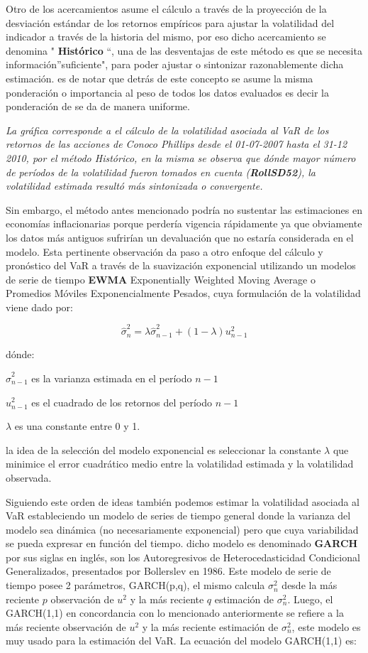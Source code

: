\documentclass[]{article}
\begin{document}
Otro de los acercamientos asume el cálculo a través de la proyección de
la desviación estándar de los retornos empíricos para ajustar la
volatilidad del indicador a través de la historia del mismo, por eso
dicho acercamiento se denomina " \textbf{Histórico} ``, una de las
desventajas de este método es que se necesita información''suficiente",
para poder ajustar o sintonizar razonablemente dicha estimación. es de
notar que detrás de este concepto se asume la misma ponderación o
importancia al peso de todos los datos evaluados es decir la ponderación
de se da de manera uniforme.

\emph{La gráfica corresponde a el cálculo de la volatilidad asociada al
VaR de los retornos de las acciones de Conoco Phillips desde el
01-07-2007 hasta el 31-12 2010, por el método Histórico, en la misma se
observa que dónde mayor número de períodos de la volatilidad fueron
tomados en cuenta (\textbf{RollSD52}), la volatilidad estimada resultó
más sintonizada o convergente.}

Sin embargo, el método antes mencionado podría no sustentar las
estimaciones en economías inflacionarias porque perdería vigencia
rápidamente ya que obviamente los datos más antiguos sufrirían un
devaluación que no estaría considerada en el modelo. Esta pertinente
observación da paso a otro enfoque del cálculo y pronóstico del VaR a
través de la suavización exponencial utilizando un modelos de serie de
tiempo \textbf{EWMA} Exponentially Weighted Moving Average o Promedios
Móviles Exponencialmente Pesados, cuya formulación de la volatilidad
viene dado por:

\[\hat{\sigma}_n^2 = \lambda \hat{\sigma}_{n-1}^2 + (1 - \lambda) u_{n-1}^2\]

dónde:

\(\hat{\sigma}_{n-1}^2\) es la varianza estimada en el período \(n-1\)

\(u_{n-1}^2\) es el cuadrado de los retornos del período \(n-1\)

\(\lambda\) es una constante entre 0 y 1.

la idea de la selección del modelo exponencial es seleccionar la
constante \(\lambda\) que minimice el error cuadrático medio entre la
volatilidad estimada y la volatilidad observada.

Siguiendo este orden de ideas también podemos estimar la volatilidad
asociada al VaR estableciendo un modelo de series de tiempo general
donde la varianza del modelo sea dinámica (no necesariamente
exponencial) pero que cuya variabilidad se pueda expresar en función del
tiempo. dicho modelo es denominado \textbf{GARCH} por sus siglas en
inglés, son los Autoregresivos de Heterocedasticidad Condicional
Generalizados, presentados por Bollerslev en 1986. Este modelo de serie
de tiempo posee 2 parámetros, GARCH(p,q), el mismo calcula
\(\sigma_n^2\) desde la más reciente \(p\) observación de \(u^2\) y la
más reciente \(q\) estimación de \(\sigma_n^2\). Luego, el GARCH(1,1) en
concordancia con lo mencionado anteriormente se refiere a la más
reciente observación de \(u^2\) y la más reciente estimación de
\(\sigma_n^2\), este modelo es muy usado para la estimación del VaR. La
ecuación del modelo GARCH(1,1) es:
\end{document}
